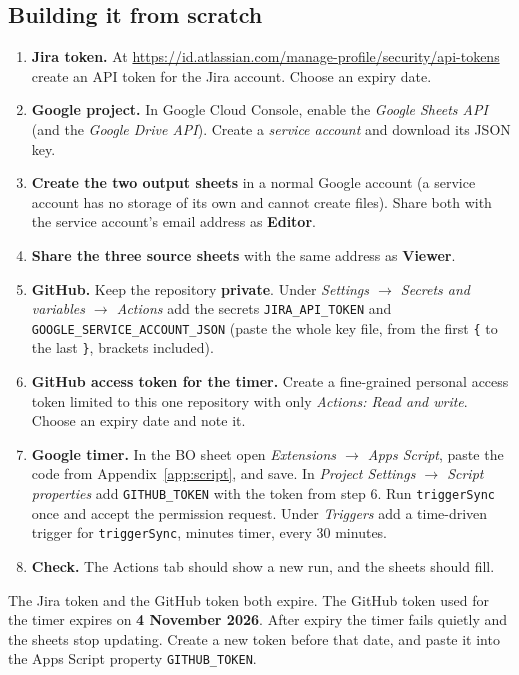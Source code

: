 \documentclass[11pt,a4paper]{article}
\newcommand{\code}[1]{\texttt{#1}}
\let\oldsubsection\subsection
\renewcommand{\subsection}{\needspace{7\baselineskip}\oldsubsection}
\begin{document}
\subsection{Building it from scratch}
\begin{enumerate}
  \item \textbf{Jira token.} At \url{https://id.atlassian.com/manage-profile/security/api-tokens} create an API token for
    the Jira account. Choose an expiry date.
  \item \textbf{Google project.} In Google Cloud Console, enable the \emph{Google Sheets API} (and the \emph{Google
    Drive API}). Create a \emph{service account} and download its JSON key.
  \item \textbf{Create the two output sheets} in a normal Google account (a service account has no storage of its own
    and cannot create files). Share both with the service account's email address as \textbf{Editor}.
  \item \textbf{Share the three source sheets} with the same address as \textbf{Viewer}.
  \item \textbf{GitHub.} Keep the repository \textbf{private}. Under \emph{Settings $\rightarrow$ Secrets and variables
    $\rightarrow$ Actions} add the secrets \code{JIRA\_API\_TOKEN} and \code{GOOGLE\_SERVICE\_ACCOUNT\_JSON} (paste the
    whole key file, from the first \code{\{} to the last \code{\}}, brackets included).
  \item \textbf{GitHub access token for the timer.} Create a fine-grained personal access token limited to this one
    repository with only \emph{Actions: Read and write}. Choose an expiry date and note it.
  \item \textbf{Google timer.} In the BO sheet open \emph{Extensions $\rightarrow$ Apps Script}, paste the code from
    Appendix~\ref{app:script}, and save. In \emph{Project Settings $\rightarrow$ Script properties} add
    \code{GITHUB\_TOKEN} with the token from step 6. Run \code{triggerSync} once and accept the permission request.
    Under \emph{Triggers} add a time-driven trigger for \code{triggerSync}, minutes timer, every 30 minutes.
  \item \textbf{Check.} The Actions tab should show a new run, and the sheets should fill.
\end{enumerate}

\begin{warning}
The Jira token and the GitHub token both expire. The GitHub token used for the timer expires on \textbf{4 November
2026}. After expiry the timer fails quietly and the sheets stop updating. Create a new token before that date, and paste
it into the Apps Script property \code{GITHUB\_TOKEN}.
\end{warning}
\end{document}
